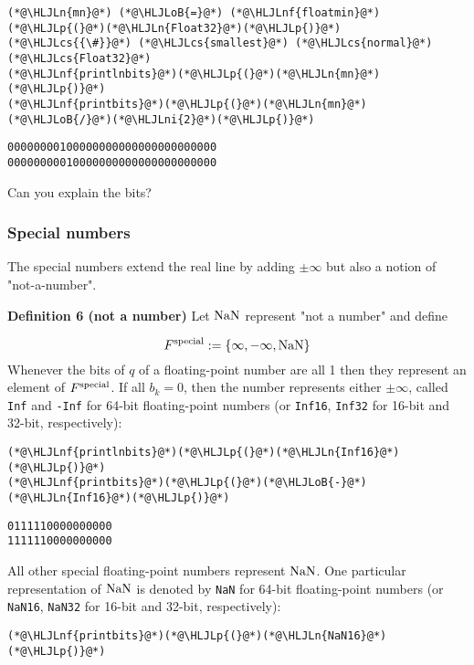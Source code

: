\documentclass[12pt,a4paper]{article}
\newcommand{\HLJLn}[1]{#1}
\newcommand{\HLJLnf}[1]{\textcolor[RGB]{66,102,213}{#1}}
\newcommand{\HLJLni}[1]{\textcolor[RGB]{59,151,46}{#1}}
\newcommand{\HLJLoB}[1]{\textcolor[RGB]{102,102,102}{\textbf{#1}}}
\newcommand{\HLJLp}[1]{#1}
\newcommand{\HLJLcs}[1]{\textcolor[RGB]{153,153,119}{\textit{#1}}}
\begin{document}
\begin{lstlisting}
(*@\HLJLn{mn}@*) (*@\HLJLoB{=}@*) (*@\HLJLnf{floatmin}@*)(*@\HLJLp{(}@*)(*@\HLJLn{Float32}@*)(*@\HLJLp{)}@*) (*@\HLJLcs{{\#}}@*) (*@\HLJLcs{smallest}@*) (*@\HLJLcs{normal}@*) (*@\HLJLcs{Float32}@*)
(*@\HLJLnf{printlnbits}@*)(*@\HLJLp{(}@*)(*@\HLJLn{mn}@*)(*@\HLJLp{)}@*)
(*@\HLJLnf{printbits}@*)(*@\HLJLp{(}@*)(*@\HLJLn{mn}@*)(*@\HLJLoB{/}@*)(*@\HLJLni{2}@*)(*@\HLJLp{)}@*)
\end{lstlisting}

\begin{lstlisting}
00000000100000000000000000000000
00000000010000000000000000000000
\end{lstlisting}


Can you explain the bits?

\subsubsection{Special numbers}
The special numbers extend the real line by adding $\ensuremath{\pm} \ensuremath{\infty}$ but also a notion of "not-a-number".

\textbf{Definition 6 (not a number)} Let ${\rm NaN}$ represent "not a number" and define

\[
F^{\rm special} := \{\ensuremath{\infty}, -\ensuremath{\infty}, {\rm NaN}\}
\]
Whenever the bits of $q$ of a floating-point number are all 1 then they represent an element of $F^{\rm special}$. If all $b_k=0$, then the number represents either $\ensuremath{\pm}\ensuremath{\infty}$, called \texttt{Inf} and \texttt{-Inf} for 64-bit floating-point numbers (or \texttt{Inf16}, \texttt{Inf32} for 16-bit and 32-bit, respectively):


\begin{lstlisting}
(*@\HLJLnf{printlnbits}@*)(*@\HLJLp{(}@*)(*@\HLJLn{Inf16}@*)(*@\HLJLp{)}@*)
(*@\HLJLnf{printbits}@*)(*@\HLJLp{(}@*)(*@\HLJLoB{-}@*)(*@\HLJLn{Inf16}@*)(*@\HLJLp{)}@*)
\end{lstlisting}

\begin{lstlisting}
0111110000000000
1111110000000000
\end{lstlisting}


All other special floating-point numbers represent ${\rm NaN}$. One particular representation of ${\rm NaN}$ is denoted by \texttt{NaN} for 64-bit floating-point numbers (or \texttt{NaN16}, \texttt{NaN32} for 16-bit and 32-bit, respectively):


\begin{lstlisting}
(*@\HLJLnf{printbits}@*)(*@\HLJLp{(}@*)(*@\HLJLn{NaN16}@*)(*@\HLJLp{)}@*)
\end{lstlisting}
\end{document}
